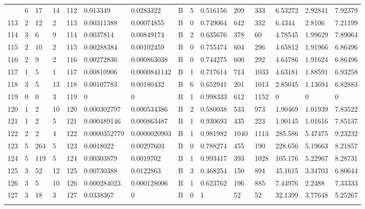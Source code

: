 \begin{latin}
\begin{longtable}{lllllllllllllll}
\begin{comment}
	112 & 6  & 17  & 14 & 112 & 0.013349       & 0.0283322      & B & 5  & 0.516156 & 209  & 333  & 6.53272 & 2.92841 & 7.92379 \\
	113 & 2  & 12  & 2  & 113 & 0.00311388     & 0.00074855     & B & 0  & 0.749064 & 642  & 332  & 6.4344  & 2.8106  & 7.21199 \\
	114 & 3  & 6   & 9  & 114 & 0.0037814      & 0.00849174     & B & 2  & 0.635676 & 378  & 60   & 4.78545 & 1.99629 & 7.89064 \\
	115 & 2  & 10  & 2  & 115 & 0.00288384     & 0.00102459     & B & 0  & 0.755474 & 604  & 296  & 4.65812 & 1.91966 & 6.86496 \\
	116 & 2  & 9   & 2  & 116 & 0.00272836     & 0.000863038    & B & 0  & 0.744275 & 600  & 292  & 4.64786 & 1.91624 & 6.86496 \\
	117 & 1  & 5   & 1  & 117 & 0.00810906     & 0.0000841142   & B & 1  & 0.717614 & 713  & 1033 & 4.63181 & 1.88591 & 6.93258 \\
	118 & 3  & 5   & 13 & 118 & 0.00107783     & 0.00180432     & B & 6  & 0.652941 & 201  & 1013 & 2.85045 & 1.13694 & 6.82883 \\
	119 & 0  & 0   & 3  & 119 & 0              & 0              & B & 1  & 0.998333 & 612  & 1152 & 0       & 0       & 0       \\
	120 & 1  & 2   & 10 & 120 & 0.000302797    & 0.000534386    & B & 2  & 0.580038 & 533  & 973  & 1.90469 & 1.01939 & 7.83522 \\
	121 & 1  & 2   & 5  & 121 & 0.000489146    & 0.000863487    & B & 1  & 0.930693 & 435  & 223  & 1.90145 & 1.01616 & 7.85137 \\
	122 & 2  & 2   & 4  & 122 & 0.0000352779   & 0.0000020903   & B & 1  & 0.981982 & 1040 & 1113 & 285.586 & 5.47475 & 9.23232 \\
	123 & 5  & 264 & 5  & 123 & 0.0018022      & 0.00297603     & B & 0  & 0.788274 & 455  & 190  & 228.656 & 5.19663 & 8.21857 \\
	124 & 5  & 119 & 5  & 124 & 0.00303879     & 0.0019702      & B & 1  & 0.993417 & 393  & 1028 & 105.176 & 5.22967 & 8.28731 \\
	125 & 3  & 52  & 12 & 125 & 0.00730388     & 0.0122863      & B & 3  & 0.468254 & 150  & 894  & 45.1615 & 3.34703 & 6.80644 \\
	126 & 3  & 5   & 10 & 126 & 0.000284023    & 0.000128006    & B & 1  & 0.623762 & 196  & 885  & 7.44976 & 2.2488  & 7.33333 \\
	127 & 3  & 18  & 3  & 127 & 0.0338367      & 0              & B & 0  & 1        & 52   & 52   & 32.1399 & 3.77648 & 5.25267 \\

\end{comment}
\end{longtable}
\end{latin}
